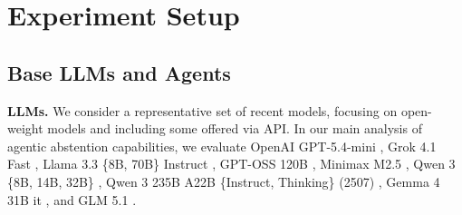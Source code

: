\documentclass{llmxive}
\begin{document}










\vspace{-2mm}
\section{Experiment Setup}
\vspace{-2mm}

\label{sec:experiments}
\subsection{Base LLMs and Agents}
\vspace{-2mm}

\textbf{LLMs.} We consider a representative set of recent models, focusing on open-weight models and including some offered via API. In our main analysis of agentic abstention capabilities, we evaluate OpenAI GPT-5.4-mini \cite{openai_gpt5mini_2025}, Grok 4.1 Fast \cite{xai2025grok41}, Llama 3.3 \{8B, 70B\} Instruct \cite{llama33_70b}, GPT-OSS 120B \cite{agarwal2025gpt}, Minimax M2.5 \cite{minimax2026m25}, Qwen 3 \{8B, 14B, 32B\} \cite{qwen3technicalreport}, Qwen 3 235B A22B \{Instruct, Thinking\} (2507) \cite{qwen3technicalreport}, Gemma 4 31B it \cite{googledeepmind2026gemma4_31bit}, and GLM 5.1 \cite{glm5team2026glm5vibecodingagentic}.
\end{document}
